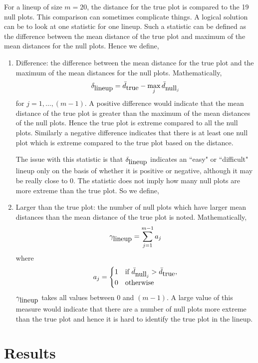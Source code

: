 \documentclass[12]{article}
\begin{document}
For a lineup of size $m = 20$, the distance for the true plot is compared to the 19 null plots. This comparison can sometimes complicate things. A logical solution can be to look at one statistic for one lineup. Such a statistic can be defined as the difference between the mean distance of the true plot and maximum of the mean distances for the null plots. Hence we define, 
\begin{enumerate}
\item Difference: the difference between the mean distance for the true plot and the maximum of the mean distances for the null plots. Mathematically,
$$\delta_{\hbox{lineup}} = \bar{d}_{\hbox{true}} - \max_j \bar{d}_{\hbox{null}_j}$$
for $j = 1, \dots, (m  - 1).$
 A positive difference would indicate that the mean distance of the true plot is greater than the maximum of the mean distances of the null plots. Hence the true plot is extreme compared to all the null plots. Similarly a negative difference indicates that there is at least one null plot which is extreme compared to the true plot based on the distance.
 
The issue with this statistic is that $\delta_{\hbox{lineup}}$ indicates an ``easy" or ``difficult" lineup only on the basis of whether it is positive or negative, although it may be really close to 0. The statistic does not imply how many null plots are more extreme than the true plot. So we define,
\item Larger than the true plot: the number of null plots which have larger mean distances than the mean distance of the true plot is noted. Mathematically,
 $$\gamma_{\hbox{lineup}} = \sum_{j = 1}^{m - 1} a_j$$ where 
\begin{equation}
a_j =
\begin{cases}
1 & \text{if } \bar{d}_{\hbox{null}_j} > \bar{d}_{\hbox{true}} ,
\\
0 & \text{otherwise}
\end{cases}
\end{equation}
$\gamma_{\hbox{lineup}}$ takes all values between 0 and $(m - 1)$. A large value of this measure would indicate that there are a number of null plots more extreme than the true plot and hence it is hard to identify the true plot in the lineup.
\end{enumerate}




\section{Results} \label{sec:results}
\end{document}
